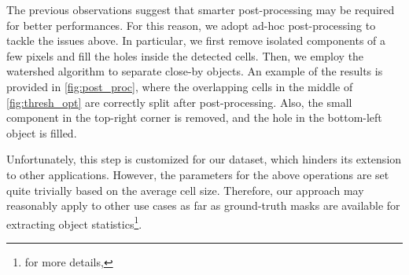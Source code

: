 The previous observations suggest that smarter post-processing may be required for better performances.
For this reason, we adopt ad-hoc post-processing to tackle the issues above.
In particular, we first remove isolated components of a few pixels and fill the holes inside the detected cells. 
Then, we employ the watershed algorithm \cite{watershed} to separate close-by objects.
An example of the results is provided in \cref{fig:post_proc}, where the overlapping cells in the middle of \cref{fig:thresh_opt} are correctly split after post-processing. Also, the small component in the top-right corner is removed, and the hole in the bottom-left object is filled.

Unfortunately, this step is customized for our dataset, which hinders its extension to other applications.
However, the parameters for the above operations are set quite trivially based on the average cell size.
Therefore, our approach may reasonably apply to other use cases as far as ground-truth masks are available for extracting object statistics\footnote{for more details, \postproc}.